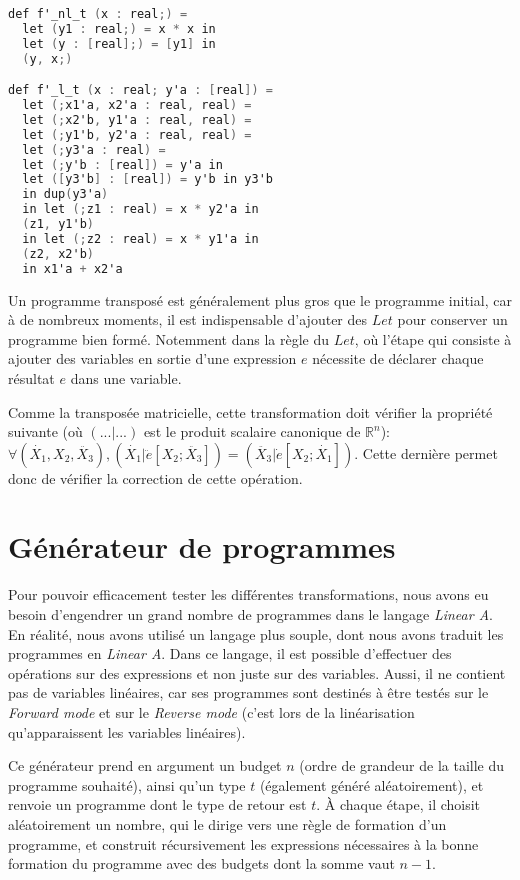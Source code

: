\documentclass[a4paper, french, 11pt]{article}
\begin{document}
\begin{lstlisting}[style=myStyle, language=C]
def f'_nl_t (x : real;) =
  let (y1 : real;) = x * x in
  let (y : [real];) = [y1] in
  (y, x;)

def f'_l_t (x : real; y'a : [real]) =
  let (;x1'a, x2'a : real, real) =
  let (;x2'b, y1'a : real, real) =
  let (;y1'b, y2'a : real, real) =
  let (;y3'a : real) =
  let (;y'b : [real]) = y'a in
  let ([y3'b] : [real]) = y'b in y3'b
  in dup(y3'a)
  in let (;z1 : real) = x * y2'a in
  (z1, y1'b)
  in let (;z2 : real) = x * y1'a in
  (z2, x2'b)
  in x1'a + x2'a
\end{lstlisting}

Un programme transposé est généralement plus gros que le programme initial, car à de nombreux moments, il est indispensable d'ajouter des $Let$ pour conserver un programme bien formé. Notemment dans la règle du $Let$, où l'étape qui consiste à ajouter des variables en sortie d'une expression $e$ nécessite de déclarer chaque résultat $e$ dans une variable.

Comme la transposée matricielle, cette transformation doit vérifier la propriété suivante (où $(...|...)$ est le produit scalaire canonique de $\mathbb{R}^n$):
$\forall (\dot{X_1}, X_2, \ddot{X_3}), (\dot{X_1}| \ddot{e}[X_2; \ddot{X_3}]) = (\ddot{X_3}| \dot e [X_2; \dot{X_1}])$.
Cette dernière permet donc de vérifier la correction de cette opération.




\section{Générateur de programmes}

Pour pouvoir efficacement tester les différentes transformations, nous avons eu besoin d'engendrer un grand nombre de programmes dans le langage \textit{Linear A}. En réalité, nous avons utilisé un langage plus souple, dont nous avons traduit les programmes en \textit{Linear A}. Dans ce langage, il est possible d'effectuer des opérations sur des expressions et non juste sur des variables. Aussi, il ne contient pas de variables linéaires, car ses programmes sont destinés à être testés sur le \textit{Forward mode} et sur le \textit{Reverse mode} (c'est lors de la linéarisation qu'apparaissent les variables linéaires).

Ce générateur prend en argument un budget $n$ (ordre de grandeur de la taille du programme souhaité), ainsi qu'un type $t$ (également généré aléatoirement), et renvoie un programme dont le type de retour est $t$. À chaque étape, il choisit aléatoirement un nombre, qui le dirige vers une règle de formation d'un programme, et construit récursivement les expressions nécessaires à la bonne formation du programme avec des budgets dont la somme vaut $n-1$.
\end{document}
